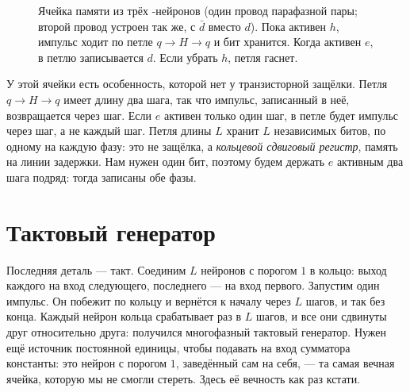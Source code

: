 \begin{figure}[t]
\centering
{}
\caption{Ячейка памяти из трёх -нейронов (один провод парафазной пары; второй провод устроен так же, с $\bar d$ вместо $d$). Пока активен $h$, импульс ходит по петле $q\to H\to q$ и бит хранится. Когда активен $e$, в петлю записывается $d$. Если убрать $h$, петля гаснет.}
\label{fig:latch}
\end{figure}

У этой ячейки есть особенность, которой нет у транзисторной защёлки. Петля $q\to H\to q$ имеет длину два шага, так что импульс, записанный в неё, возвращается через шаг. Если $e$ активен только один шаг, в петле будет импульс через шаг, а не каждый шаг. Петля длины $L$ хранит $L$ независимых битов, по одному на каждую фазу: это не защёлка, а \emph{кольцевой сдвиговый регистр}, память на линии задержки. Нам нужен один бит, поэтому будем держать $e$ активным два шага подряд: тогда записаны обе фазы.

\section{Тактовый генератор}

Последняя деталь --- такт. Соединим $L$ нейронов с порогом $1$ в кольцо: выход каждого на вход следующего, последнего --- на вход первого. Запустим один импульс. Он побежит по кольцу и вернётся к началу через $L$ шагов, и так без конца. Каждый нейрон кольца срабатывает раз в $L$ шагов, и все они сдвинуты друг относительно друга: получился многофазный тактовый генератор. Нужен ещё источник постоянной единицы, чтобы подавать на вход сумматора константы: это нейрон с порогом $1$, заведённый сам на себя, --- та самая вечная ячейка, которую мы не смогли стереть. Здесь её вечность как раз кстати.

